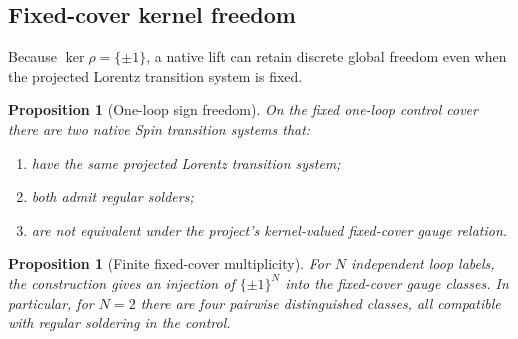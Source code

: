 \documentclass[11pt,a4paper]{article}
\newtheorem{proposition}[theorem]{Proposition}
\theoremstyle{definition}
\theoremstyle{remark}
\begin{document}
\subsection{Fixed-cover kernel freedom}

Because \(\ker\rho=\{\pm1\}\), a native lift can retain discrete global
freedom even when the projected Lorentz transition system is fixed.

\begin{proposition}[One-loop sign freedom]
\label{prop:one-loop-freedom}
On the fixed one-loop control cover there are two native Spin transition
systems that:
\begin{enumerate}
\item have the same projected Lorentz transition system;
\item both admit regular solders;
\item are not equivalent under the project's kernel-valued fixed-cover
      gauge relation.
\end{enumerate}
\end{proposition}

\begin{proposition}[Finite fixed-cover multiplicity]
\label{prop:multi-loop}
For \(N\) independent loop labels, the construction gives an injection of
\(\{\pm1\}^{N}\) into the fixed-cover gauge classes.  In particular, for
\(N=2\) there are four pairwise distinguished classes, all compatible with
regular soldering in the control.
\end{proposition}
\end{document}
